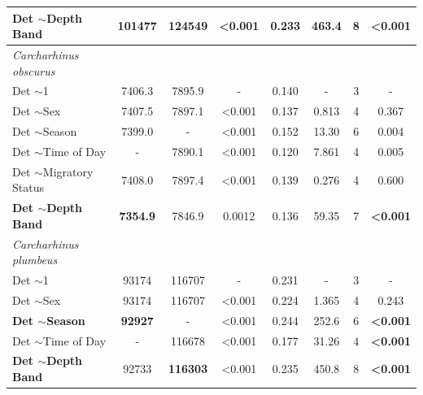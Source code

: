 \documentclass[11pt,a4paper]{article}
\begin{document}
\begin{table}[h!]
\begin{tabular}{lccccccc}
			Det $\sim$Depth Band           & 101477      & 124549      & \textless 0.001         & 0.233                   & 463.4                  & 8           & \textbf{\textless 0.001} \\ \hline
			\textit{Carcharhinus obscurus} &             &             &                         &                         &                        &             &                 \\
			Det $\sim$1                    & 7406.3      & 7895.9      & -                       & 0.140                   & -                      & 3           & -               \\
			Det $\sim$Sex                  & 7407.5      & 7897.1      & \textless 0.001         & 0.137                   & 0.813                  & 4           & 0.367           \\
			Det $\sim$Season               & 7399.0      & -           & \textless 0.001         & 0.152                   & 13.30                  & 6           & 0.004           \\
			Det $\sim$Time of Day          & -           & 7890.1      & \textless 0.001         & 0.120                   & 7.861                  & 4           & 0.005           \\
			Det $\sim$Migratory Status     & 7408.0      & 7897.4      & \textless 0.001         & 0.139                   & 0.276                  & 4           & 0.600           \\
			\textbf{Det $\sim$Depth Band}           & \textbf{7354.9}      & 7846.9      & 0.0012                  & 0.136                   & 59.35                  & 7           & \textbf{\textless 0.001} \\ \hline
			\textit{Carcharhinus plumbeus} &             &             &                         &                         &                        &             &                 \\
			Det $\sim$1                    & 93174       & 116707      & -                       & 0.231                   & -                      & 3           & -               \\
			Det $\sim$Sex                  & 93174       & 116707      & \textless 0.001         & 0.224                   & 1.365                  & 4           & 0.243           \\
			\textbf{Det $\sim$Season}               & \textbf{92927}       & -           & \textless 0.001         & 0.244                   & 252.6                  & 6           & \textbf{\textless 0.001} \\
			Det $\sim$Time of Day          & -           & 116678      & \textless 0.001         & 0.177                   & 31.26                  & 4           & \textbf{\textless 0.001} \\
			\textbf{Det $\sim$Depth Band}           & 92733       & \textbf{116303}      & \textless 0.001         & 0.235                   & 450.8                  & 8           & \textbf{\textless 0.001} \\ \hline
		\end{tabular}
		\label{det_outputs}
	\end{table}
	
	
\end{document}
